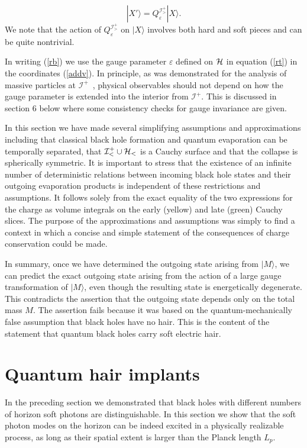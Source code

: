 \documentclass[12pt]{article}
\numberwithin{equation}{section}
\def\ip{${\mathcal I}^+$}
\def\e{{\epsilon}}
\def\ci{{\mathcal I}}
\def\>{\rangle }
\def\ch{{\cal H}}
\newcommand{\be}{\begin{equation}}
\newcommand{\ee}{\end{equation}}
\renewcommand{\epsilon}{\varepsilon}
\begin{document}
\be |X' \>= Q_\e^{\ci^+_>}|X\>.\ee
We note that the action of $Q_\e^{\ci^+_>}$ on $|X\>$ involves both hard and soft pieces and can be quite nontrivial. 

    In writing (\ref{rb}) we use the gauge parameter $\e$ defined on $\ch$ in equation (\ref{rt}) in the coordinates (\ref{addv}). In principle,  as was demonstrated for the analysis of massive particles at \ip\ \cite{Kapec:2015ena},  physical observables should not depend on how the gauge parameter is extended into the interior from $\ci^+$. This is discussed in section 6 below where some consistency checks for gauge invariance are given. 
    
    In this section we have made several simplifying assumptions and approximations including that classical black hole formation and quantum evaporation can be temporally separated, that $\ci^+_<\cup\ch_<$ is a Cauchy surface and that the collapse is spherically symmetric. It is important to stress that the 
 existence of an infinite number of deterministic relations between incoming black hole states and their outgoing evaporation products is independent of these restrictions and assumptions. It follows solely from the exact equality of the two expressions for the charge as volume integrals on the early (yellow) and late (green) Cauchy slices. The purpose of the approximations and assumptions was simply to find a context in which a concise and simple statement of the consequences of charge conservation could be made. 

In summary, once we have determined the outgoing state arising from $|M\>$, we can predict the exact outgoing state arising from the action of a large gauge transformation of  $|M\>$, even though the resulting state is energetically degenerate. This contradicts the assertion that the outgoing state depends only on the total mass $M$.  The assertion fails because it was based on the quantum-mechanically false assumption that  black holes have no hair. This is the content of the statement that quantum black holes carry  soft electric hair. 
\section{Quantum hair implants}
In the preceding section we demonstrated that black holes with different numbers of horizon soft photons
are distinguishable. In this section we  show that the soft photon modes on the horizon can be indeed excited in a physically realizable process, as long as their spatial extent is larger than the Planck length $L_p$.  
\end{document}
